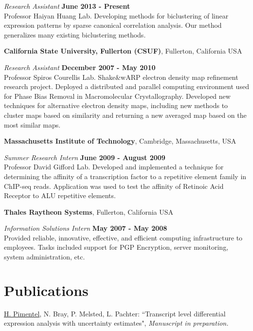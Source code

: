 \documentclass[margin,line]{res}
\begin{document}
\begin{resume}
{\em Research Assistant} \hfill {\bf June 2013 - Present}\\
Professor Haiyan Huang Lab. Developing methods for biclustering of linear
expression patterns by sparse canonical correlation analysis. Our method
generalizes many existing biclustering methods.

{\bf California State University, Fullerton (CSUF)}, Fullerton, California USA
\vspace{-.3cm}

{\em Research Assistant} \hfill {\bf December 2007 - May 2010}\\
Professor Spiros Courellis Lab. Shake\&wARP electron density map refinement
research project. Deployed a distributed and parallel computing environment used
for Phase Bias Removal in Macromolecular Crystallography. Developed new
techniques for alternative electron density maps, including new methods to
cluster maps based on similarity and returning a new averaged map based on the
most similar maps.

\newpage

{\bf Massachusetts Institute of Technology}, Cambridge, Massachusetts,
USA

\vspace{-.3cm}
{\em Summer Research Intern} \hfill {\bf June 2009 - August 2009}\\
Professor David Gifford Lab. Developed and implemented a technique for
determining the affinity of a transcription factor to a repetitive element
family in ChIP-seq reads. Application was used to test the affinity of Retinoic
Acid Receptor to ALU repetitive elements.

{\bf Thales Raytheon Systems}, Fullerton, California USA

\vspace{-.3cm}
{\em Information Solutions Intern} \hfill {\bf May 2007 - May 2008}\\
Provided reliable, innovative, effective, and efficient computing infrastructure
to employees. Tasks included support for PGP Encryption, server monitoring,
system administration, etc.


\section{\sc Publications}

\underline{H. Pimentel}, N. Bray, P. Melsted, L. Pachter: ``Transcript level differential expression analysis with uncertainty estimates", {\emph{Manuscript in preparation.}}


\end{resume}
\end{document}
